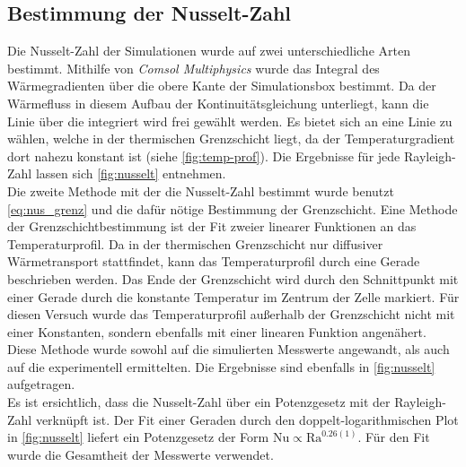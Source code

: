 \subsection{Bestimmung der Nusselt-Zahl}
Die Nusselt-Zahl der Simulationen wurde auf zwei unterschiedliche Arten bestimmt. 
Mithilfe von \emph{Comsol Multiphysics} wurde das Integral des Wärmegradienten über die obere Kante der Simulationsbox bestimmt.
Da der Wärmefluss in diesem Aufbau der Kontinuitätsgleichung unterliegt, kann die Linie über die integriert wird frei gewählt werden. 
Es bietet sich an eine Linie zu wählen, welche in der thermischen Grenzschicht liegt, da der Temperaturgradient dort nahezu konstant ist (siehe \cref{fig:temp-prof}).
Die Ergebnisse für jede Rayleigh-Zahl lassen sich \cref{fig:nusselt} entnehmen. 
\\
Die zweite Methode mit der die Nusselt-Zahl bestimmt wurde benutzt \cref{eq:nus_grenz} und die dafür nötige Bestimmung der Grenzschicht. 
Eine Methode der Grenzschichtbestimmung ist der Fit zweier linearer Funktionen an das Temperaturprofil. Da in der thermischen Grenzschicht nur diffusiver Wärmetransport stattfindet, kann das Temperaturprofil durch eine Gerade beschrieben werden.
Das Ende der Grenzschicht wird durch den Schnittpunkt mit einer Gerade durch die konstante Temperatur im Zentrum der Zelle markiert. 
Für diesen Versuch wurde das Temperaturprofil außerhalb der Grenzschicht nicht mit einer Konstanten, sondern ebenfalls mit einer linearen Funktion angenähert.
\\
Diese Methode wurde sowohl auf die simulierten Messwerte angewandt, als auch auf die experimentell ermittelten. Die Ergebnisse sind ebenfalls in \cref{fig:nusselt} aufgetragen.
\\
Es ist ersichtlich, dass die Nusselt-Zahl über ein Potenzgesetz mit der Rayleigh-Zahl verknüpft ist. Der Fit einer Geraden durch den doppelt-logarithmischen Plot in \cref{fig:nusselt} liefert ein Potenzgesetz der Form $\text{Nu} \propto \text{Ra}^{0.26(1)}$.
Für den Fit wurde die Gesamtheit der Messwerte verwendet.
